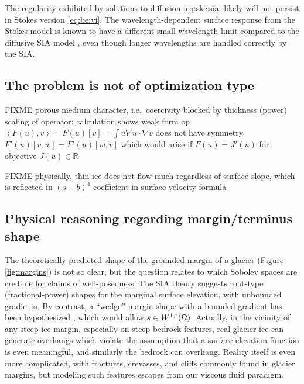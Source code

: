 \documentclass[hidelinks,onefignum,onetabnum,final]{siamart220329}  %
\newcommand{\RR}{\mathbb{R}}
\newcommand{\grad}{\nabla}
\newcommand{\rr}{{\text{\textnormal{r}}}}
\newcommand{\ip}[2]{\left<#1,#2\right>}
\begin{document}
The regularity exhibited by solutions to diffusion \eqref{eq:ske:sia} likely will not persist in Stokes version \eqref{eq:be:vi}.  The wavelength-dependent surface response from the Stokes model is known to have a different small wavelength limit compared to the diffusive SIA model \cite[for example]{Pattynetal2008}, even though longer wavelengths are handled correctly by the SIA.

\subsection{The problem is not of optimization type} \label{subsec:notopt}  FIXME porous medium character, i.e.~coercivity blocked by thickness (power) scaling of operator; calculation shows weak form op $\ip{F(u)}{v} = F(u)[v] = \int u \grad u\cdot \grad v$ does not have symmetry $F'(u)[v,w] = F'(u)[w,v]$ which would arise if $F(u)=J'(u)$ for objective $J(u) \in \RR$

FIXME physically, thin ice does not flow much regardless of surface slope, which is reflected in $(s-b)^4$ coefficient in surface velocity formula

\subsection{Physical reasoning regarding margin/terminus shape} \label{subsec:margin}  The theoretically predicted shape of the grounded margin of a glacier (Figure \ref{fig:margins}) is not so clear, but the question relates to which Sobolev spaces are credible for claims of well-posedness.  The SIA theory suggests root-type (fractional-power) shapes \cite{Bueleretal2005} for the marginal surface elevation, with unbounded gradients.  By contrast, a ``wedge'' margin shape with a bounded gradient has been hypothesized \cite[for example]{EchelmeyerKamb1986}, which would allow $s\in W^{1,\rr}(\Omega)$.  Actually, in the vicinity of any steep ice margin, especially on steep bedrock features, real glacier ice can generate overhangs which violate the assumption that a surface elevation function is even meaningful, and similarly the bedrock can overhang.  Reality itself is even more complicated, with fractures, crevasses, and cliffs commonly found in glacier margins, but modeling such features escapes from our viscous fluid paradigm.
\end{document}
